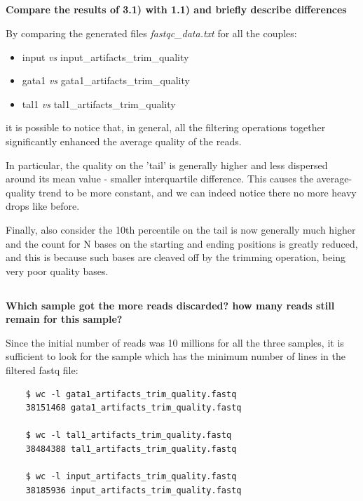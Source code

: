 \documentclass[12pt, a4paper]{article}
\begin{document}
	\subsection{}
	\textbf{Compare the results of 3.1) with 1.1) and briefly describe differences}
	
	By comparing the generated files \textit{fastqc\_data.txt} for all the couples:
	\begin{itemize}
		\item input \textit{vs} input\_artifacts\_trim\_quality
		\item gata1 \textit{vs} gata1\_artifacts\_trim\_quality
		\item tal1 \textit{vs} tal1\_artifacts\_trim\_quality
	\end{itemize}
	it is possible to notice that, in general, all the filtering operations together significantly enhanced the average quality of the reads.

	In particular, the quality on the 'tail' is generally higher and less dispersed around its mean value - smaller interquartile difference. This causes the average-quality trend to be more constant, and we can indeed notice there no more heavy drops like before.

	Finally, also consider the 10th percentile on the tail is now generally much higher and the count for N bases on the starting and ending positions is greatly reduced, and this is because such bases are cleaved off by the trimming operation, being very poor quality bases.
	
	\subsection{}
	\textbf{Which sample got the more reads discarded? how many reads still remain for this sample?}
	
	Since the initial number of reads was 10 millions for all the three samples, it is sufficient to look for the sample which has the minimum number of lines in the filtered fastq file:
	
	\begin{verbatim}
	$ wc -l gata1_artifacts_trim_quality.fastq 
	38151468 gata1_artifacts_trim_quality.fastq
	
	$ wc -l tal1_artifacts_trim_quality.fastq 
	38484388 tal1_artifacts_trim_quality.fastq
	
	$ wc -l input_artifacts_trim_quality.fastq 
	38185936 input_artifacts_trim_quality.fastq
	\end{verbatim}
	
\end{document}
